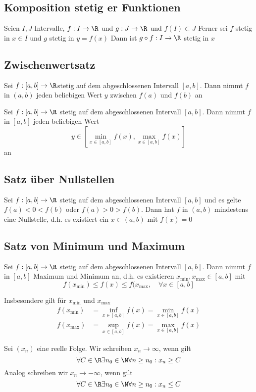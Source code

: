 	\subsection{Komposition stetig er Funktionen}
		\begin{Satz} [ ]
			Seien $I, J$ Intervalle, $f: I\to\R$ und $g: J\to \R$ und $f(I)\subset J$ \newline 
			Ferner sei $f$ stetig in $x\in I$ und $g$ stetig in $y=f(x)$ \newline
			Dann ist $g\circ f: I\to \R$ stetig in $x$
		\end{Satz}
	\subsection{Zwischenwertsatz}
		\begin{Satz} [ ]
			Sei $f:[a, b]\to\R$stetig auf dem abgeschlossenen Intervall $[a, b]$. Dann nimmt $f$ in $(a, b)$ jeden beliebigen Wert $y$ zwischen $f(a)$ und $f(b)$ an
		\end{Satz}
		\begin{Satz} [ ]
			Sei $f:[a, b]\to \R$ stetig auf dem abgeschlossenen Intervall $[a, b]$. Dann nimmt $f$ in $[a, b]$ jeden beliebigen Wert
			$$
				y\in [\min_{x\in[a, b]}f(x), \max_{x\in[a, b]}f(x)]
			$$
			an
		\end{Satz}
	\subsection{Satz über Nullstellen}
		\begin{Satz} [ ]
			Sei $f:[a, b]\to \R$ stetig auf dem abgeschlossenen Intervall $[a, b]$ und es gelte $f(a)<0<f(b)$ oder $f(a) > 0 > f(b)$. Dann hat $f$ in $(a, b)$ mindestens eine Nullstelle, d.h. es existiert ein $x\in(a, b)$ mit $f(x)=0$
		\end{Satz}
	\subsection{Satz von Minimum und Maximum}
		\begin{Satz} [ ]
			Sei $f:[a, b]\to \R$ stetig auf dem abgeschlossenen Intervall $[a, b]$. Dann nimmt $f$ in $[a, b]$ Maximum und Minimum an, d.h. es existieren $x_{\min}
			, x_{\max} \in [a, b]$ mit 
			$$
				f(x_{\min})\leq f(x) \leq f(x_{\max}, \quad \forall x\in [a, b]
			$$
		\end{Satz}
		Insbesondere gilt für $x_{\min}$ und $x_{\max}$
		\begin{align*}
			f(x_{\min}) &= \inf_{x\in[a, b]} f(x) = \min_{x\in [a, b]} f(x) \\
			f(x_{\max}) & = \sup_{x\in [a, b]} f(x) = \max_{x \in [a, b]} f(x)
		\end{align*}
		\begin{Definition} [ ]
			Sei $(x_n)$ eine reelle Folge. Wir schreiben $x_n\to\infty$, wenn gilt
			$$
				\forall C \in \R\exists n_0\in\N\forall n\geq n_0: x_n\geq C
			$$
			Analog schreiben wir $x_n\to -\infty$, wenn gilt
			$$
				\forall C \in\R\exists n_0\in\N\forall n\geq n_0:x_n\leq C
			$$
		\end{Definition}
